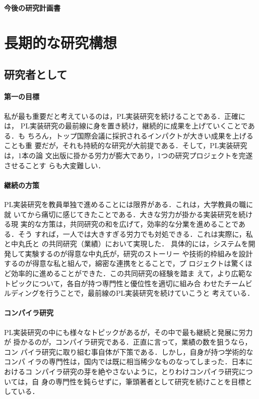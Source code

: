 \documentclass[dvipdfmx]{jsarticle}
\begin{document}
\newpage
\begin{center}
\LARGE\bfseries 今後の研究計画書
\end{center}

\section*{長期的な研究構想}

\subsection*{研究者として}

\paragraph{第一の目標}
私が最も重要だと考えているのは，PL実装研究を続けることである．正確には，
PL実装研究の最前線に身を置き続け，継続的に成果を上げていくことである．も
ちろん，トップ国際会議に採択されるインパクトが大きい成果を上げることも重
要だが，それも持続的な研究が大前提である．そして，PL実装研究は，1本の論
文出版に掛かる労力が膨大であり，1つの研究プロジェクトを完遂させることす
らも大変難しい．

\paragraph{継続の方策}
PL実装研究を教員単独で進めることには限界がある．これは，大学教員の職に就
いてから痛切に感じてきたことである．大きな労力が掛かる実装研究を続ける現
実的な方策は，共同研究の和を広げて，効率的な分業を進めることである．そう
すれば，一人では大きすぎる労力でも対処できる．これは実際に，私と中丸氏と
の共同研究（業績\cite{splash22:mvnb,ppl23:notebook}）において実現した．
具体的には，システムを開発して実験するのが得意な中丸氏が，研究のストーリー
や技術的枠組みを設計するのが得意な私と組んで，綿密な連携をとることで，プ
ロジェクトは驚くほど効率的に進めることができた．この共同研究の経験を踏ま
えて，より広範なトピックについて，各自が持つ専門性と優位性を適切に組み合
わせたチームビルディングを行うことで，最前線のPL実装研究を続けていこうと
考えている．

\paragraph{コンパイラ研究}
PL実装研究の中にも様々なトピックがあるが，その中で最も継続と発展に労力が
掛かるのが，コンパイラ研究である．正直に言って，業績の数を狙うなら，コン
パイラ研究に取り組む事自体が下策である．しかし，自身が持つ学術的なコンパ
イラの専門性は，国内では既に相当稀少なものなってしまった．日本におけるコ
ンパイラ研究の芽を絶やさないように，とりわけコンパイラ研究については，自
身の専門性を鈍らせずに，筆頭著者として研究を続けことを目標としている．
\end{document}
